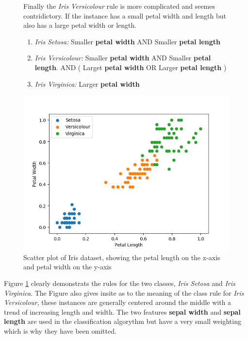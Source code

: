 \begin{figure}[H]
	\centering

	\begin{minipage}[p]{0.51\textwidth}
	 Finally the \textit{Iris Versicolour} rule is more complicated and seemes contridictory. If the instance has a small petal width and length but also has a large petal width or length.
\begin{enumerate}
	\item \textit{Iris Setosa: } Smaller \textbf{petal width} AND Smaller \textbf{petal length}
	\item \textit{Iris Versicolour: } Smaller \textbf{petal width} AND Smaller \textbf{petal length}. AND ( Larget \textbf{petal width} OR Larger \textbf{petal length} )
	\item \textit{Iris Virginica: } Larger \textbf{petal width}
\end{enumerate}
	\end{minipage}
	\hspace{4px}
	\begin{minipage}[p]{0.45\textwidth}
		\includegraphics[width=\textwidth]{IrisData(petal(length-vs-width)).png}
		\caption{Scatter plot of Iris dataset, showing the petal length on the x-axis and petal width on the y-axis}
		\label{fig:iris-data-petal-length-vs-width}
	\end{minipage}
	\hfill
\end{figure}

Figure \ref{fig:iris-data-petal-length-vs-width} clearly demonstrats the rules for the two classes, \textit{Iris Setosa} and \textit{Iris Virginica}. The Figure also gives insite as to the meaning of the class rule for \textit{Iris Versicolour}, these instances are generally centered around the middle with a trend of increasing length and width. The two features \textbf{sepal width} and \textbf{sepal length} are used in the classification algorythm but have a very small weighting which is why they have been omitted.

